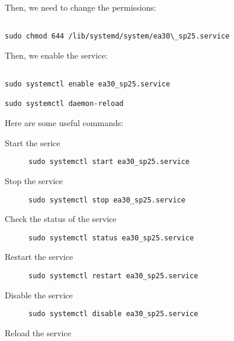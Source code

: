 \documentclass{article}
\begin{document}
\begin{description}
Then, we need to change the permissions: 

\begin{verbatim}

sudo chmod 644 /lib/systemd/system/ea30\_sp25.service

\end{verbatim}

Then, we enable the service:

\begin{verbatim}

sudo systemctl enable ea30_sp25.service

sudo systemctl daemon-reload

\end{verbatim}


Here are some useful commands:

\begin{description}

\item[Start the serice]
\par

\begin{verbatim}
sudo systemctl start ea30_sp25.service
\end{verbatim}

\item[Stop the service]

\begin{verbatim}
sudo systemctl stop ea30_sp25.service
\end{verbatim}

\item[Check the status of the service]

\begin{verbatim}
sudo systemctl status ea30_sp25.service
\end{verbatim}

\item[Restart the service]

\begin{verbatim}
sudo systemctl restart ea30_sp25.service
\end{verbatim}

\item[Disable the service]

\begin{verbatim}
sudo systemctl disable ea30_sp25.service
\end{verbatim}

\item[Reload the service]


\end{description}
\end{description}
\end{document}
